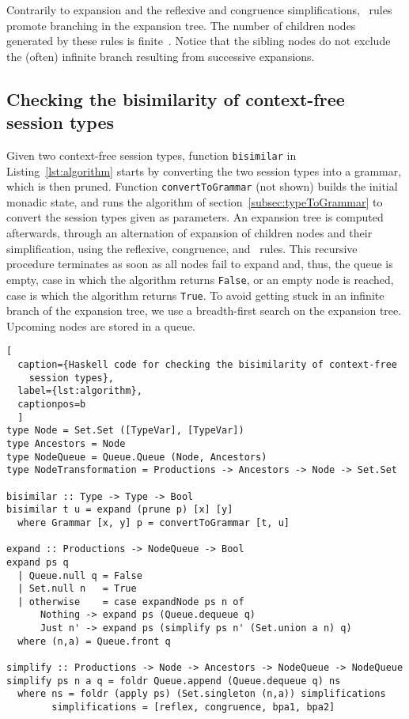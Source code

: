 Contrarily to expansion and the reflexive and congruence
simplifications, \BPA\ rules promote branching in the expansion
tree. The number of children nodes generated by these rules is
finite~\cite{DBLP:journals/iandc/ChristensenHS95}.
%
Notice that the sibling nodes do not exclude the (often) infinite
branch resulting from successive expansions.

\subsection{Checking the bisimilarity of context-free session types}


Given two context-free session types, function \lstinline|bisimilar|
in Listing~\ref{lst:algorithm} starts by converting the two session
types into a grammar, which is then pruned. Function
\lstinline|convertToGrammar| (not shown) builds the initial monadic
state, and runs the algorithm of section~\ref{subsec:typeToGrammar} to
convert the session types given as parameters.
%
An expansion tree is computed afterwards, through an alternation of
expansion of children nodes and their simplification, using the
reflexive, congruence, and \BPA\ rules. This recursive procedure
terminates as soon as all nodes fail to expand and, thus, the queue is
empty, case in which the algorithm returns \lstinline|False|, or an
empty node is reached, case is which the algorithm returns
\lstinline|True|.
%
To avoid getting stuck in an infinite branch of the expansion tree, we
use a breadth-first search on the expansion tree. Upcoming nodes are
stored in a queue.

\begin{lstlisting}[
  caption={Haskell code for checking the bisimilarity of context-free
    session types},
  label={lst:algorithm},
  captionpos=b
  ]
type Node = Set.Set ([TypeVar], [TypeVar])
type Ancestors = Node
type NodeQueue = Queue.Queue (Node, Ancestors)
type NodeTransformation = Productions -> Ancestors -> Node -> Set.Set

bisimilar :: Type -> Type -> Bool
bisimilar t u = expand (prune p) [x] [y]
  where Grammar [x, y] p = convertToGrammar [t, u]

expand :: Productions -> NodeQueue -> Bool
expand ps q
  | Queue.null q = False 
  | Set.null n   = True
  | otherwise    = case expandNode ps n of
      Nothing -> expand ps (Queue.dequeue q)
      Just n' -> expand ps (simplify ps n' (Set.union a n) q)
  where (n,a) = Queue.front q

simplify :: Productions -> Node -> Ancestors -> NodeQueue -> NodeQueue
simplify ps n a q = foldr Queue.append (Queue.dequeue q) ns
  where ns = foldr (apply ps) (Set.singleton (n,a)) simplifications
        simplifications = [reflex, congruence, bpa1, bpa2]
\end{lstlisting}

